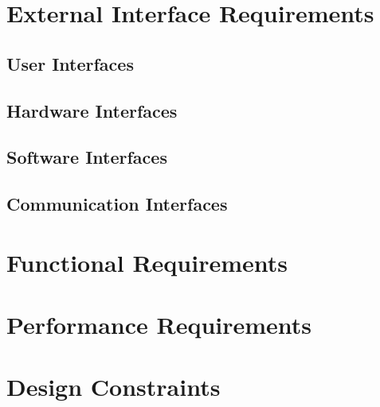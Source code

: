 
\section{External Interface Requirements}
\label{s:External_interface_requirements}%

\subsection{User Interfaces}
\label{ss:User_interfaces}%

\subsection{Hardware Interfaces}
\label{ss:Hardware_interfaces}%

\subsection{Software Interfaces}
\label{ss:Software_interfaces}%

\subsection{Communication Interfaces}
\label{ss:Communication_interfaces}%


\section{Functional Requirements}
\label{s:Functional_requirements}%

\section{Performance Requirements}
\label{s:Performance_requirements}%

\section{Design Constraints}
\label{s:Design_constraints}%

